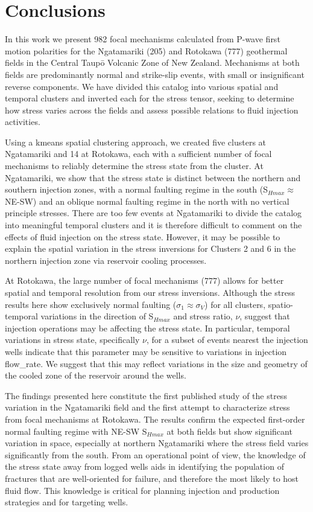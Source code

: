 \section{Conclusions}
In this work we present 982 focal mechanisms calculated from P-wave first motion polarities for the Ngatamariki (205) and Rotokawa (777) geothermal fields in the Central Taup\={o} Volcanic Zone of New Zealand. Mechanisms at both fields are predominantly normal and strike-slip events, with small or insignificant reverse components. We have divided this catalog into various spatial and temporal clusters and inverted each for the stress tensor, seeking to determine how stress varies across the fields and assess possible relations to fluid injection activities.

Using a kmeans spatial clustering approach, we created five clusters at Ngatamariki and 14 at Rotokawa, each with a sufficient number of focal mechanisms to reliably determine the stress state from the cluster. At Ngatamariki, we show that the stress state is distinct between the northern and southern injection zones, with a normal faulting regime in the south (S$_{Hmax}\approx{}$ NE-SW) and an oblique normal faulting regime in the north with no vertical principle stresses. There are too few events at Ngatamariki to divide the catalog into meaningful temporal clusters and it is therefore difficult to comment on the effects of fluid injection on the stress state. However, it may be possible to explain the spatial variation in the stress inversions for Clusters 2 and 6 in the northern injection zone via reservoir cooling processes.

At Rotokawa, the large number of focal mechanisms (777) allows for better spatial and temporal resolution from our stress inversions. Although the stress results here show exclusively normal faulting ($\sigma_{1}\approx{\sigma_{V}}$) for all clusters, spatio-temporal variations in the direction of S$_{Hmax}$ and stress ratio, $\nu$, suggest that injection operations may be affecting the stress state. In particular, temporal variations in stress state, specifically $\nu$, for a subset of events nearest the injection wells indicate that this parameter may be sensitive to variations in injection \gls{flow_rate}. We suggest that this may reflect variations in the size and geometry of the cooled zone of the reservoir around the wells.

The findings presented here constitute the first published study of the stress variation in the Ngatamariki field and the first attempt to characterize stress from focal mechanisms at Rotokawa. The results confirm the expected first-order normal faulting regime with NE-SW S$_{Hmax}$ at both fields but show significant variation in space, especially at northern Ngatamariki where the stress field varies significantly from the south. From an operational point of view, the knowledge of the stress state away from logged wells aids in identifying the population of fractures that are well-oriented for failure, and therefore the most likely to host fluid flow. This knowledge is critical for planning injection and production strategies and for targeting wells.

